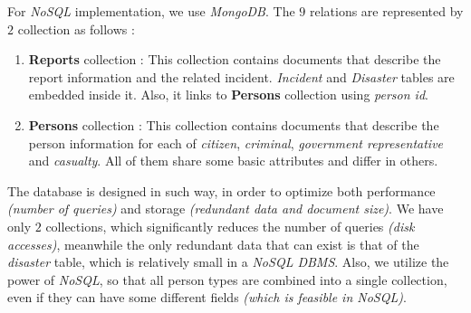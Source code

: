 For \emph{NoSQL} implementation, we use \emph{MongoDB}. The $9$ relations are represented by $2$ collection as follows :
\begin{enumerate}
    \item \textbf{Reports} collection : This collection contains documents that describe the report information and the related incident. \emph{Incident} and \emph{Disaster} tables are embedded inside it. Also, it links to \textbf{Persons} collection using \emph{person id}.
    \item \textbf{Persons} collection : This collection contains documents that describe the person information for each of \emph{citizen}, \emph{criminal}, \emph{government representative} and \emph{casualty}. All of them share some basic attributes and differ in others.
\end{enumerate}

The database is designed in such way, in order to optimize both performance \emph{(number of queries)} and storage \emph{(redundant data and document size)}. We have only $2$ collections, which significantly reduces the number of queries \emph{(disk accesses)}, meanwhile the only redundant data that can exist is that of the \emph{disaster} table, which is relatively small in a \emph{NoSQL DBMS}. Also, we utilize the power of \emph{NoSQL}, so that all person types are combined into a single collection, even if they can have some different fields \emph{(which is feasible in NoSQL)}.